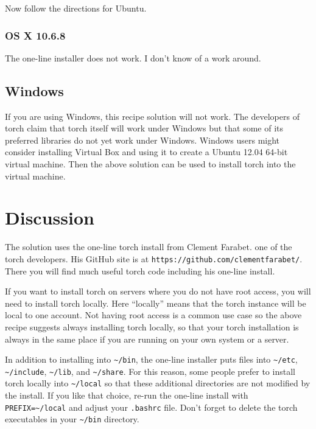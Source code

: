 \documentclass{article}
\let\code\texttt %
\begin{document}
Now follow the directions for Ubuntu.



\subsubsection{OS X 10.6.8}

The one-line installer does not work. I don't know of a work around.

\subsection{Windows}

If you are using Windows, this recipe solution will not work. The
developers of torch claim that torch itself will work under Windows but
that some of its preferred libraries do not yet work under Windows.
Windows users might consider installing Virtual Box and using it to
create a Ubuntu 12.04 64-bit virtual machine. Then the above solution
can be used to install torch into the virtual machine.

\section{Discussion}

The solution uses the one-line torch install from Clement Farabet. one
of the torch developers. His GitHub site is at
\code{https://github.com/clementfarabet/}. There you will find much
useful torch code including his one-line install.


If you want to install torch on servers where you do not have root
access, you will need to install torch locally. Here ``locally'' means
that the torch instance will be local to one account. Not having root
access is a common use case so the above recipe suggests always
installing torch locally, so that your torch installation is always in
the same place if you are running on your own system or a server.

In addition to installing into \code{\textasciitilde/bin}, the one-line
installer puts files into \code{\textasciitilde/etc},
\code{\textasciitilde/include}, \code{\textasciitilde/lib}, and
\code{\textasciitilde/share}. For this reason, some people prefer to
install torch locally into \code{\textasciitilde/local} so that these
additional directories are not modified by the install. If you like that
choice, re-run the one-line install with
\code{PREFIX=\textasciitilde/local} and adjust your \code{.bashrc} file.
Don't forget to delete the torch executables in your
\code{\textasciitilde/bin} directory.
\end{document}
